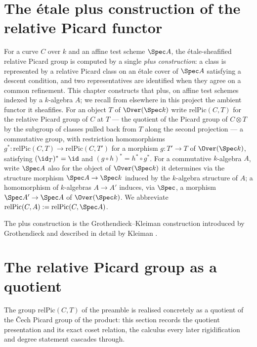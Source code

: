 \section{The \'etale plus construction of the relative Picard functor}
\label{pa-chap:PicardEtale}

For a curve \(C\) over \(k\) and an affine test scheme \(\Spec A\), the \'etale-sheafified
relative Picard group is computed by a single \emph{plus construction}: a class is represented
by a relative Picard class on an \'etale cover of \(\Spec A\) satisfying a descent condition,
and two representatives are identified when they agree on a common refinement. This chapter
constructs that plus, on affine test schemes indexed by a \(k\)-algebra \(A\); we recall from
elsewhere in this project the ambient functor it sheafifies. For an object \(T\) of
\(\Over(\Spec k)\) write \(\mathrm{relPic}(C,T)\) for the relative Picard group of \(C\) at
\(T\) --- the quotient of the Picard group of \(C \otimes T\) by the subgroup of classes pulled
back from \(T\) along the second projection --- a commutative group, with restriction
homomorphisms \(g^{*} \colon \mathrm{relPic}(C,T) \to \mathrm{relPic}(C,T')\) for a morphism
\(g \colon T' \to T\) of \(\Over(\Spec k)\), satisfying \((\id_T)^{*} = \id\) and
\((g \circ h)^{*} = h^{*} \circ g^{*}\). For a commutative \(k\)-algebra \(A\), write \(\Spec A\)
also for the object of \(\Over(\Spec k)\) it determines via the structure morphism
\(\Spec A \to \Spec k\) induced by the \(k\)-algebra structure of \(A\); a homomorphism of
\(k\)-algebras \(A \to A'\) induces, via \(\Spec\), a morphism \(\Spec A' \to \Spec A\) of
\(\Over(\Spec k)\). We abbreviate \(\mathrm{relPic}(C,A) := \mathrm{relPic}(C,\Spec A)\).

The plus construction is the Grothendieck--Kleiman construction introduced by
Grothendieck \cite{grothendieck-fga} and described in detail by Kleiman
\cite{kleiman-picard}.

\section{The relative Picard group as a quotient}

The group \(\mathrm{relPic}(C,T)\) of the preamble is realised concretely as a quotient of
the \v Cech Picard group of the product: this section records the quotient presentation and
its exact coset relation, the calculus every later rigidification and degree statement
cascades through.


